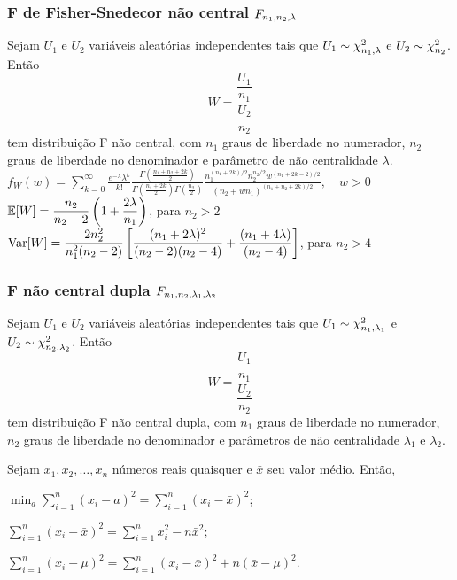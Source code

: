\subsubsection{F de Fisher-Snedecor não central $F_{n_1,n_2,\lambda}$}
\begin{outline}
	\1 Sejam $U_1$ e $U_2$ variáveis aleatórias independentes tais que $U_1\sim\chi^2_{n_1,\lambda}$ e $U_2\sim\chi^2_{n_2}$. Então
	\begin{equation}
		W = \frac{\dfrac{U_1}{n_1}}{\dfrac{U_2}{n_2}}
	\end{equation}
	tem distribuição F não central, com $n_1$ graus de liberdade no numerador, $n_2$ graus de liberdade no denominador e parâmetro de não centralidade $\lambda$.
	\1 \(\displaystyle f_W(w) = \sum_{k=0}^{\infty}\frac{e^{-\lambda}\lambda^k}{k!}\frac{\Gamma\left(\frac{n_1+n_2+2k}{2}\right)}{\Gamma\left(\frac{n_1+2k}{2}\right)\Gamma\left(\frac{n_2}{2}\right)}\frac{n_1^{(n_1+2k)/2}n_2^{n_2/2}w^{(n_1+2k-2)/2}}{(n_2+wn_1)^{(n_1+n_2+2k)/2}}, \quad w>0\)
	\1 $\operatorname{\mathbb{E}}[W] = \dfrac{n_2}{n_2-2}\left(1+\dfrac{2\lambda}{n_1}\right)$, para $n_2>2$
	\1 $\operatorname{Var}[W] = \dfrac{2n_2^2}{n_1^2(n_2-2)}\left[\dfrac{(n_1+2\lambda)^2}{(n_2-2)(n_2-4)}+\dfrac{(n_1+4\lambda)}{(n_2-4)}\right]$, para $n_2>4$
\end{outline}

\subsubsection{F não central dupla $F_{n_1,n_2,\lambda_1,\lambda_2}$}
\begin{outline}
	\1 Sejam $U_1$ e $U_2$ variáveis aleatórias independentes tais que $U_1\sim\chi^2_{n_1,\lambda_1}$ e $U_2\sim\chi^2_{n_2,\lambda_2}$. Então
	\begin{equation}
		W = \frac{\dfrac{U_1}{n_1}}{\dfrac{U_2}{n_2}}
	\end{equation}
	tem distribuição F não central dupla, com $n_1$ graus de liberdade no numerador, $n_2$ graus de liberdade no denominador e parâmetros de não centralidade $\lambda_1$ e $\lambda_2$.
\end{outline}

\begin{theorem}
	Sejam $x_1, x_2, \ldots, x_n$ números reais quaisquer e $\bar{x}$ seu valor médio. Então,
	\begin{outline}[enumerate]
		\1 $\min_a \sum_{i=1}^{n} (x_i - a)^2 = \sum_{i=1}^{n} (x_i - \bar{x})^2$;
		
		\1 $\sum_{i=1}^{n} (x_i - \bar{x})^2 = \sum_{i=1}^{n} x_i^2 - n\bar{x}^2$;
		
		\1 $\sum_{i=1}^{n} (x_i - \mu)^2 = \sum_{i=1}^{n} (x_i - \bar{x})^2 + n(\bar{x} - \mu)^2$.
	\end{outline}
\end{theorem}

